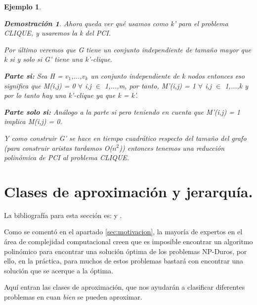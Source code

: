 \documentclass[a4paper,12pt,titlepage]{article}
\newtheorem{eje}{Ejemplo}[section]
\newtheorem*{dem}{\textbf{Demostraci\'on}}
\begin{document}
\begin{eje}
\begin{dem}
\vspace{\baselineskip}

Ahora queda ver qu\'e usamos como k' para el problema CLIQUE, y usaremos la k del PCI.

Por \'ultimo veremos que G tiene un conjunto independiente de tamaño mayor que k  si y solo si G' tiene una k'-clique.

\vspace{\baselineskip}

\textbf{Parte si:} Sea H = {$v_1$,...,$v_k$} un conjunto independiente de k nodos entonces eso significa que M(i,j) = 0 $\forall$ i,j $\in$ {1,...,m}, por tanto, M'(i,j) = 1 $\forall$ i,j $\in$ {1,...,k} y por lo tanto hay una k'-clique ya que k = k'.

\vspace{\baselineskip}

\textbf{Parte solo si:} An\'alogo a la parte si pero teniendo en cuenta que M'(i,j) = 1 implica M(i,j) = 0.

\vspace{\baselineskip}

Y como construir G' se hace en tiempo cuadr\'atico respecto del tamaño del grafo (para construir aristas tardamos O($n^2$)) entonces tenemos una reducci\'on polin\'omica de PCI al problema CLIQUE.

\end{dem}

\end{eje}

\newpage

\section{Clases de aproximaci\'on y jerarqu\'ia.}
\label{sec:clases}

La bibliograf\'ia para esta secci\'on es: \cite{MAX_CLIQ_INA} y \cite{approx_core}. 

\vspace{0.3cm}

Como se coment\'o en el apartado \ref{sec:motivacion}, la mayor\'ia de expertos en el \'area de complejidad computacional creen que es imposible encontrar un algoritmo polin\'omico para encontrar una soluci\'on \'optima de los problemas NP-Duros, por ello, en la pr\'actica, para muchos de estos problemas bastar\'a con encontrar una soluci\'on que se acerque a la \'optima.

Aqu\'i entran las clases de aproximaci\'on, que nos ayudar\'an a clasificar diferentes problemas en cuan \textit{bien} se pueden aproximar.
\end{document}
